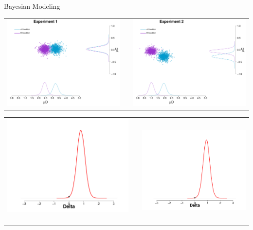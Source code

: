 \documentclass[final]{beamer}
\newlength{\onecolwid}
\newlength{\twocolwid}
\begin{document}
\begin{frame}[t]
\begin{columns}[t]
\begin{column}{\twocolwid}
\begin{columns}[t,totalwidth=\twocolwid]
\begin{column}{\onecolwid}
\begin{alertblock}{Bayesian Modeling}
\begin{enumerate}
\begin{center}
\begin{tabular}{ccc}
\includegraphics[width=0.45\linewidth]{Figures/Modelo_Delta_MeanDC_1.pdf} & \hfill & \includegraphics[width=0.45\linewidth]{Figures/Modelo_Delta_MeanDC_2.pdf}
\end{tabular}
\end{center}

\begin{center}
\begin{tabular}{ccc}
\includegraphics[width=0.35\linewidth]{Figures/Delta_1.pdf}  $\qquad$ $\qquad$ & \hfill & \includegraphics[width=0.35\linewidth]{Figures/Delta_2.pdf}
\end{tabular}
\end{center}




\end{enumerate}
\end{alertblock}
\end{column}
\end{columns}
\end{column}
\end{columns}
\end{frame}
\end{document}
